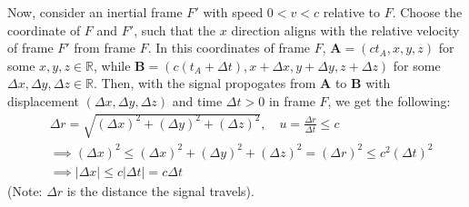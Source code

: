 \documentclass{article}
\newcommand{\RR}{\mathbb{R}}
\newcommand{\bA}{\textbf{A}}
\newcommand{\bB}{\textbf{B}}
\begin{document}
\begin{itemize}
    Now, consider an inertial frame $F'$ with speed $0<v<c$ relative to $F$. Choose the coordinate of $F$ and $F'$, such that the $x$ direction aligns with the relative velocity of frame $F'$ from frame $F$. In this coordinates of frame $F$, $\bA=(ct_A, x,y,z)$ for some $x,y,z\in \RR$, while $\bB = (c(t_A+\Delta t),x+\Delta x,y+\Delta y,z+\Delta z)$ for some $\Delta x,\Delta y,\Delta z\in\RR$. Then, with the signal propogates from $\bA$ to $\bB$ with displacement $(\Delta x,\Delta y,\Delta z)$ and time $\Delta t>0$ in frame $F$, we get the following:
    \begin{align}
        &\Delta r=\sqrt{(\Delta x)^2+(\Delta y)^2+(\Delta z)^2},\quad u = \frac{\Delta r}{\Delta t} \leq c\\
        &\implies (\Delta x)^2\leq (\Delta x)^2+(\Delta y)^2 + (\Delta z)^2=(\Delta r)^2\leq c^2(\Delta t)^2\\
        &\implies |\Delta x|\leq c|\Delta t| = c\Delta t
    \end{align}
    (Note: $\Delta r$ is the distance the signal travels).


\end{itemize}
\end{document}
